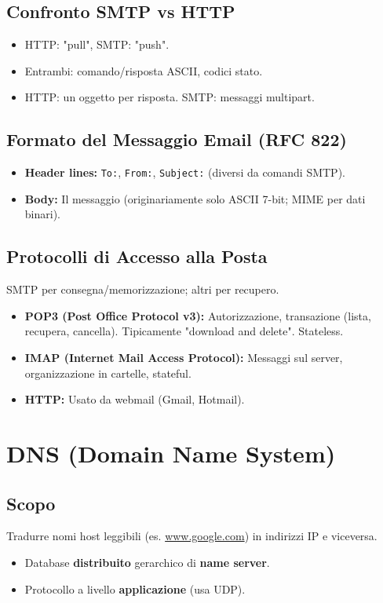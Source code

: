 \subsection{Confronto SMTP vs HTTP}
\begin{itemize}
    \item HTTP: "pull", SMTP: "push".
    \item Entrambi: comando/risposta ASCII, codici stato.
    \item HTTP: un oggetto per risposta. SMTP: messaggi multipart.
\end{itemize}

\subsection{Formato del Messaggio Email (RFC 822)}
\begin{itemize}
    \item \textbf{Header lines:} \texttt{To:}, \texttt{From:}, \texttt{Subject:} (diversi da comandi SMTP).
    \item \textbf{Body:} Il messaggio (originariamente solo ASCII 7-bit; MIME per dati binari).
\end{itemize}

\subsection{Protocolli di Accesso alla Posta}
SMTP per consegna/memorizzazione; altri per recupero.
\begin{itemize}
    \item \textbf{POP3 (Post Office Protocol v3):} Autorizzazione, transazione (lista, recupera, cancella). Tipicamente "download and delete". Stateless.
    \item \textbf{IMAP (Internet Mail Access Protocol):} Messaggi sul server, organizzazione in cartelle, stateful.
    \item \textbf{HTTP:} Usato da webmail (Gmail, Hotmail).
\end{itemize}


\section{DNS (Domain Name System)}
\subsection{Scopo}
Tradurre nomi host leggibili (es. \url{www.google.com}) in indirizzi IP e viceversa.
\begin{itemize}
    \item Database \textbf{distribuito} gerarchico di \textbf{name server}.
    \item Protocollo a livello \textbf{applicazione} (usa UDP).
\end{itemize}

